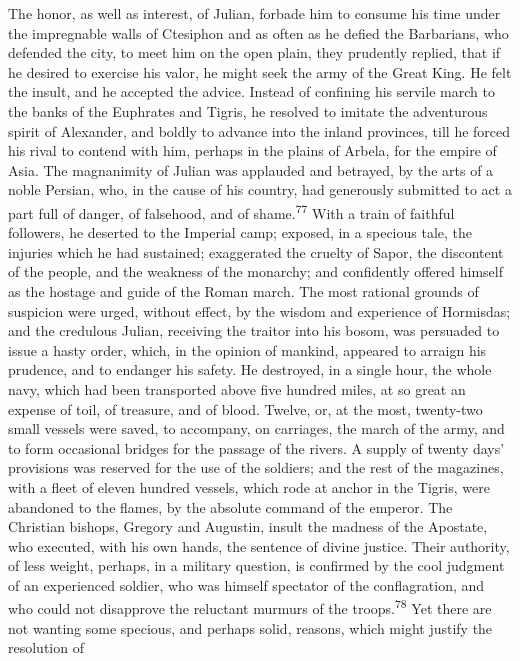 The honor, as well as interest, of Julian, forbade him to consume
his time under the impregnable walls of Ctesiphon and as often as
he defied the Barbarians, who defended the city, to meet him on
the open plain, they prudently replied, that if he desired to
exercise his valor, he might seek the army of the Great King. He
felt the insult, and he accepted the advice. Instead of confining
his servile march to the banks of the Euphrates and Tigris, he
resolved to imitate the adventurous spirit of Alexander, and
boldly to advance into the inland provinces, till he forced his
rival to contend with him, perhaps in the plains of Arbela, for
the empire of Asia. The magnanimity of Julian was applauded and
betrayed, by the arts of a noble Persian, who, in the cause of
his country, had generously submitted to act a part full of
danger, of falsehood, and of shame.\textsuperscript{77} With a train of faithful
followers, he deserted to the Imperial camp; exposed, in a
specious tale, the injuries which he had sustained; exaggerated
the cruelty of Sapor, the discontent of the people, and the
weakness of the monarchy; and confidently offered himself as the
hostage and guide of the Roman march. The most rational grounds
of suspicion were urged, without effect, by the wisdom and
experience of Hormisdas; and the credulous Julian, receiving the
traitor into his bosom, was persuaded to issue a hasty order,
which, in the opinion of mankind, appeared to arraign his
prudence, and to endanger his safety. He destroyed, in a single
hour, the whole navy, which had been transported above five
hundred miles, at so great an expense of toil, of treasure, and
of blood. Twelve, or, at the most, twenty-two small vessels were
saved, to accompany, on carriages, the march of the army, and to
form occasional bridges for the passage of the rivers. A supply
of twenty days’ provisions was reserved for the use of the
soldiers; and the rest of the magazines, with a fleet of eleven
hundred vessels, which rode at anchor in the Tigris, were
abandoned to the flames, by the absolute command of the emperor.
The Christian bishops, Gregory and Augustin, insult the madness
of the Apostate, who executed, with his own hands, the sentence
of divine justice. Their authority, of less weight, perhaps, in a
military question, is confirmed by the cool judgment of an
experienced soldier, who was himself spectator of the
conflagration, and who could not disapprove the reluctant murmurs
of the troops.\textsuperscript{78} Yet there are not wanting some specious, and
perhaps solid, reasons, which might justify the resolution of
